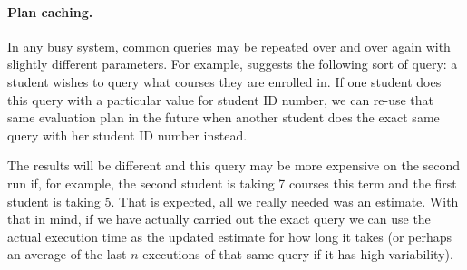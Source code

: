 \paragraph{Plan caching.} In any busy system, common queries may be repeated over and over again with slightly different parameters. For example, \cite{dsc} suggests the following sort of query: a student wishes to query what courses they are enrolled in. If one student does this query with a particular value for student ID number, we can re-use that same evaluation plan in the future when another student does the exact same query with her student ID number instead. 

The results will be different and this query may be more expensive on the second run if, for example, the second student is taking 7 courses this term and the first student is taking 5. That is expected, all we really needed was an estimate. With that in mind, if we have actually carried out the exact query we can use the actual execution time as the updated estimate for how long it takes (or perhaps an average of the last $n$ executions of that same query if it has high variability). 





